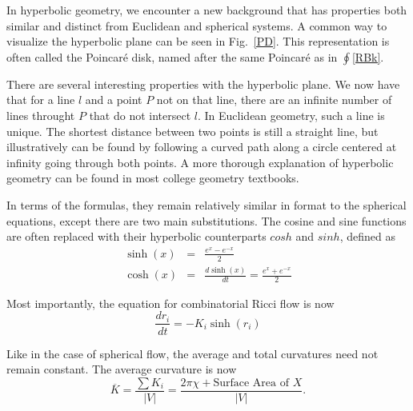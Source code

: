 \documentclass[12pt]{article}
\begin{document}
In hyperbolic geometry, we encounter a new background that has properties both similar and distinct from Euclidean and spherical systems. A common way to visualize the hyperbolic plane can be seen in Fig.~\ref{PD}. This representation is often called the Poincar\'{e} disk, named after the same Poincar\'{e} as in $\oint$\ref{RBk}.\newline

\noindent There are several interesting properties with the hyperbolic plane. We now have that for a line $l$ and a point $P$ not on that line, there are an infinite number of lines throught $P$ that do not intersect $l$. In Euclidean geometry, such a line is unique. The shortest distance between two points is still a straight line, but illustratively can be found by following a curved path along a circle centered at infinity going through both points. A more thorough explanation of hyperbolic geometry can be found in most college geometry textbooks.\newline

\noindent In terms of the formulas, they remain relatively similar in format to the spherical equations, except there are two main substitutions. The cosine and sine functions are often replaced with their hyperbolic counterparts $cosh$ and $sinh$, defined as
\begin{eqnarray*}
\sinh(x) &=& \frac{e^x - e^{-x}}{2}\\
\cosh(x) &=& \frac{d\sinh(x)}{dt} = \frac{e^x + e^{-x}}{2}
\end{eqnarray*}

\noindent Most importantly, the equation for combinatorial Ricci flow is now
\begin{equation}
\label{HRiccif}
\frac{dr_i}{dt} = -K_i\sinh(r_i)
\end{equation}
\noindent 

\noindent Like in the case of spherical flow, the average and total curvatures need not remain constant. The average curvature is now
$$\overline{K} = \frac{\sum{K_i}}{|V|} = \frac{2\pi\chi + \mbox{Surface Area of }X}{|V|}.$$
\end{document}
